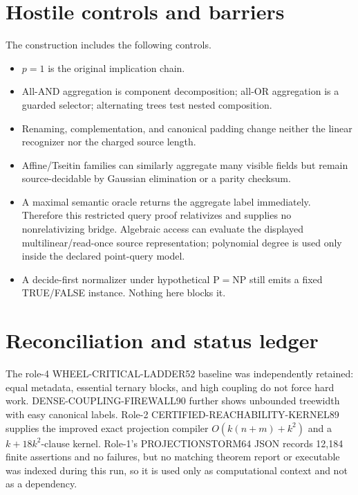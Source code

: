 \documentclass[11pt]{article}
\begin{document}
\section{Hostile controls and barriers}
The construction includes the following controls.
\begin{itemize}
\item $p=1$ is the original implication chain.
\item All-AND aggregation is component decomposition; all-OR aggregation is a
guarded selector; alternating trees test nested composition.
\item Renaming, complementation, and canonical padding change neither the
linear recognizer nor the charged source length.
\item Affine/Tseitin families can similarly aggregate many visible fields but
remain source-decidable by Gaussian elimination or a parity checksum.
\item A maximal semantic oracle returns the aggregate label immediately.
Therefore this restricted query proof relativizes and supplies no
nonrelativizing bridge.  Algebraic access can evaluate the displayed
multilinear/read-once source representation; polynomial degree is used only
inside the declared point-query model.
\item A decide-first normalizer under hypothetical P$=$NP still emits a fixed
TRUE/FALSE instance.  Nothing here blocks it.
\end{itemize}

\section{Reconciliation and status ledger}
The role-4 WHEEL-CRITICAL-LADDER52 baseline was independently retained: equal
metadata, essential ternary blocks, and high coupling do not force hard work.
DENSE-COUPLING-FIREWALL90 further shows unbounded treewidth with easy canonical
labels.  Role-2 CERTIFIED-REACHABILITY-KERNEL89 supplies the improved exact
projection compiler $O(k(n+m)+k^2)$ and a $k+18k^2$-clause kernel.  Role-1's
PROJECTIONSTORM64 JSON records 12,184 finite assertions and no failures, but no
matching theorem report or executable was indexed during this run, so it is
used only as computational context and not as a dependency.
\end{document}

